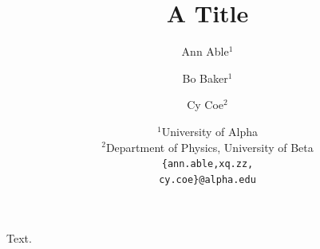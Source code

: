 \documentclass{article}
\title{A Title}
\author{%
  Ann Able$^{1}$ \\
  \and
  Bo Baker$^{1}$ \\
  \and
  Cy Coe$^{2}$ \\
  \and
 {\normalfont $^1$University of Alpha} \\
 {\normalfont $^2$Department of Physics, University of Beta} \\
 \texttt{\{ann.able,xq.zz,}\\
 \texttt{cy.coe\}@alpha.edu}
}
\begin{document}
\maketitle
Text.
\end{document}
